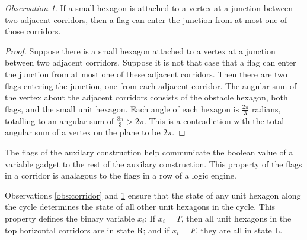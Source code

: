 \documentclass[10pt]{CSUNthesis}
\theoremstyle{plain}%
\theoremstyle{definition}
\theoremstyle{remark}
\newtheorem{observation}{Observation}
\begin{document}
\begin{observation}\label{obs:junction}
If a small hexagon is attached to a vertex at a junction between two adjacent corridors, then a flag can enter the junction from at most one of those corridors.
\end{observation}
\begin{proof}
Suppose there is a small hexagon attached to a vertex at a junction between two adjacent corridors.
Suppose it is not that case that a flag can enter the junction from at most one of these adjacent corridors.
Then there are two flags entering the junction, one from each adjacent corridor.
The angular sum of the vertex about the adjacent corridors consists of the obstacle hexagon, both flags, and the small unit hexagon.
Each angle of each hexagon is $\frac{2 \pi}{3}$ radians, totalling to an angular sum of $\frac{8 \pi}{3} > 2 \pi$.
This is a contradiction with the total angular sum of a vertex on the plane to be $2 \pi$.
\end{proof}

The flags of the auxilary construction help communicate the boolean value of a variable gadget to the rest of the auxilary construction.
This property of the flags in a corridor is analagous to the flags in a row of a logic engine.

Observations \ref{obs:corridor} and \ref{obs:junction} ensure that the state of any unit hexagon along the cycle determines the state of all other unit hexagons in the cycle. 
This property defines the binary variable $x_i$: If $x_i=T$, then all unit hexagons in the top horizontal corridors are in state R; and if $x_i=F$, they are all in state L.
\end{document}
